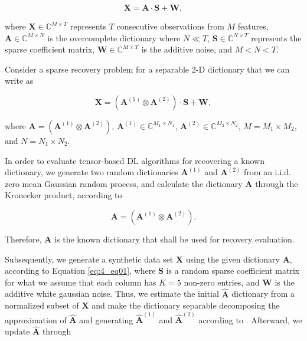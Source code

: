 \begin{equation}\label{eq:4_eq01}
	\boldsymbol{X} = \boldsymbol{A} \cdot \boldsymbol{S} + \boldsymbol{W},
\end{equation}

where $\boldsymbol{X} \in \mathbb{C}^{M \times T}$ represents $T$ consecutive observations from $M$ features, $\boldsymbol{A} \in \mathbb{C}^{M \times N}$ is the overcomplete dictionary where $N \ll T$, $\boldsymbol{S} \in \mathbb{C}^{N \times T}$ represents the sparse coefficient matrix, $\boldsymbol{W} \in \mathbb{C}^{M \times T}$ is the additive noise, and $M < N < T$.

Consider a sparse recovery problem for a separable 2-D dictionary that we can write as

\begin{equation}\label{eq:4_eq02}
	\boldsymbol{X} = (\boldsymbol{A}^{(1)} \otimes \boldsymbol{A}^{(2)}) \cdot \boldsymbol{S} + \boldsymbol{W},
\end{equation}

where $\boldsymbol{A} = (\boldsymbol{A}^{(1)} \otimes \boldsymbol{A}^{(2)})$, $\boldsymbol{A}^{(1)} \in \mathbb{C}^{M_1 \times N_1}$, $\boldsymbol{A}^{(2)} \in \mathbb{C}^{M_2 \times N_2}$, $M = M_1 \times M_2$, and $N = N_1 \times N_2$.

In order to evaluate tensor-based DL algorithms for recovering a known dictionary, we generate two random dictionaries $\boldsymbol{A}^{(1)}$ and $\boldsymbol{A}^{(2)}$ from an i.i.d. zero mean Gaussian random process, and calculate the dictionary $\boldsymbol{A}$ through the Kronecker product, according to 

\begin{equation}\label{eq:4_eq03}
	\boldsymbol{A} = (\boldsymbol{A}^{(1)} \otimes \boldsymbol{A}^{(2)}).
\end{equation}

Therefore, $\boldsymbol{A}$ is the known dictionary that shall be used for recovery evaluation. 

Subsequently, we generate a synthetic data set $\boldsymbol{X}$ using the given dictionary $\boldsymbol{A}$, according to Equation \ref{eq:4_eq01}, where $\boldsymbol{S}$ is a random sparse coefficient matrix for what we assume that each column has $K = 5$ non-zero entries, and $\boldsymbol{W}$ is the additive white gaussian noise. Thus, we estimate the initial $\boldsymbol{\hat{A}}$ dictionary from a normalized subset of $\boldsymbol{X}$ and make the dictionary separable decomposing the approximation of $\boldsymbol{\hat{A}}$ and generating $\boldsymbol{\hat{A}}^{(1)}$ and $\boldsymbol{\hat{A}}^{(2)}$ according to \cite{van1993approximation}. Afterward, we update $\boldsymbol{\hat{A}}$ through 

